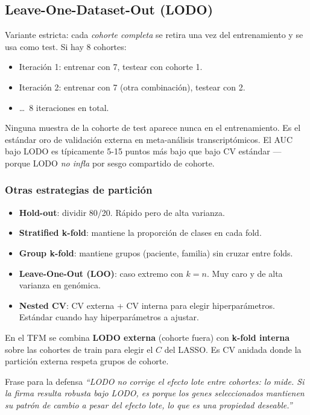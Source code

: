 \documentclass[11pt, a4paper]{article}
\begin{document}
\subsection{Leave-One-Dataset-Out (LODO)}

Variante estricta: cada \emph{cohorte completa} se retira una vez del
entrenamiento y se usa como test. Si hay 8 cohortes:

\begin{itemize}[leftmargin=1.2em]
  \item Iteraci\'on 1: entrenar con 7, testear con cohorte 1.
  \item Iteraci\'on 2: entrenar con 7 (otra combinaci\'on), testear con 2.
  \item \dots\ 8 iteraciones en total.
\end{itemize}

Ninguna muestra de la cohorte de test aparece nunca en el entrenamiento.
Es el est\'andar oro de validaci\'on externa en meta-an\'alisis
transcript\'omicos. El AUC bajo LODO es t\'ipicamente 5-15 puntos m\'as
bajo que bajo CV est\'andar --- porque LODO \emph{no infla} por sesgo
compartido de cohorte.

\subsubsection*{Otras estrategias de partici\'on}

\begin{itemize}[leftmargin=1.2em]
  \item \textbf{Hold-out}: dividir 80/20. R\'apido pero de alta varianza.
  \item \textbf{Stratified k-fold}: mantiene la proporci\'on de clases
  en cada fold.
  \item \textbf{Group k-fold}: mantiene grupos (paciente, familia) sin
  cruzar entre folds.
  \item \textbf{Leave-One-Out (LOO)}: caso extremo con $k = n$. Muy caro
  y de alta varianza en gen\'omica.
  \item \textbf{Nested CV}: CV externa + CV interna para elegir
  hiperpar\'ametros. Est\'andar cuando hay hiperpar\'ametros a ajustar.
\end{itemize}

En el TFM se combina \textbf{LODO externa} (cohorte fuera) con
\textbf{k-fold interna} sobre las cohortes de train para elegir el
$C$ del LASSO. Es CV anidada donde la partici\'on externa respeta grupos
de cohorte.

\begin{concepto}{Frase para la defensa}
\emph{``LODO no corrige el efecto lote entre cohortes: lo mide. Si la
firma resulta robusta bajo LODO, es porque los genes seleccionados
mantienen su patr\'on de cambio a pesar del efecto lote, lo que es una
propiedad deseable.''}
\end{concepto}
\end{document}
